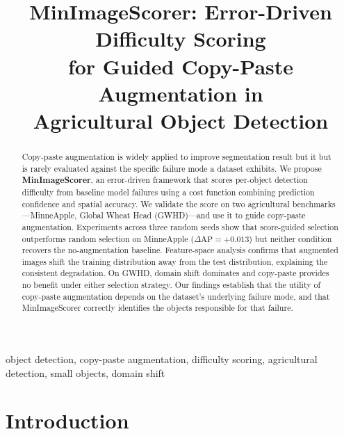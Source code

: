 \documentclass[conference]{IEEEtran}
\begin{document}
\title{MinImageScorer: Error-Driven Difficulty Scoring\\
for Guided Copy-Paste Augmentation in\\
Agricultural Object Detection}

\author{
}

\maketitle

\begin{abstract}
Copy-paste augmentation is widely applied to improve segmentation result
but it  
but is rarely evaluated against the specific failure mode a dataset
exhibits. We propose \textbf{MinImageScorer}, an error-driven framework
that scores per-object detection difficulty from baseline model failures
using a cost function combining prediction confidence and spatial
accuracy. We validate the score on two agricultural
benchmarks---MinneApple, Global Wheat Head (GWHD)---and use it to
guide copy-paste augmentation. Experiments across three random seeds
show that score-guided selection outperforms random selection on
MinneApple ($\Delta\mathrm{AP}{=}{+}0.013$) but neither condition
recovers the no-augmentation baseline. Feature-space analysis confirms
that augmented images shift the training distribution away from the
test distribution, explaining the consistent degradation. On GWHD,
domain shift dominates and copy-paste provides no benefit under either
selection strategy. Our findings establish that the utility of
copy-paste augmentation depends on the dataset's underlying failure
mode, and that MinImageScorer correctly identifies the objects
responsible for that failure.
\end{abstract}

\begin{IEEEkeywords}
object detection, copy-paste augmentation, difficulty scoring,
agricultural detection, small objects, domain shift
\end{IEEEkeywords}

\section{Introduction}
\end{document}
